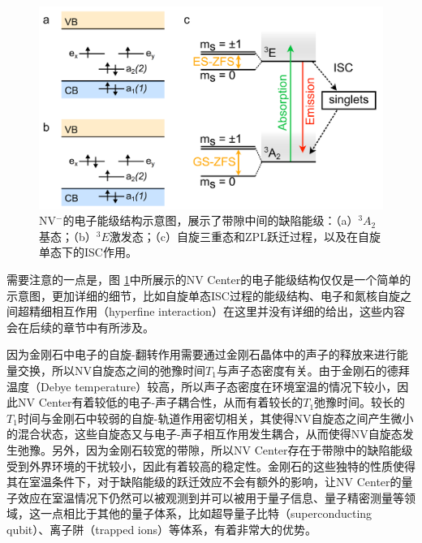 \documentclass[type = bachelor, oneside]{whu-thesis}
\begin{document}
\begin{figure}
  \centering
  \includegraphics[width=1.0\textwidth]{figures/Chapter 2/Electronic Structure.png}
  \caption[NV$^-$的电子能级结构示意图]{NV$^-$的电子能级结构示意图，展示了带隙中间的缺陷能级：（a）$^3A_2$基态；（b）$^3E$激发态；（c）自旋三重态和ZPL跃迁过程，以及在自旋单态下的ISC作用\cite{Staudacher2015}。}
  \label{fig: Electronic Structure}
\end{figure}

需要注意的一点是，图 \ref{fig: Electronic Structure}中所展示的NV Center的电子能级结构仅仅是一个简单的示意图，更加详细的细节，比如自旋单态ISC过程的能级结构、电子和氮核自旋之间超精细相互作用（hyperfine interaction）在这里并没有详细的给出，这些内容会在后续的章节中有所涉及。

因为金刚石中电子的自旋-翻转作用需要通过金刚石晶体中的声子的释放来进行能量交换，所以NV自旋态之间的弛豫时间$T_1$与声子态密度有关。由于金刚石的德拜温度（Debye temperature）较高，所以声子态密度在环境室温的情况下较小，因此NV Center有着较低的电子-声子耦合性，从而有着较长的$T_1$弛豫时间\cite{2008}。较长的$T_1$时间与金刚石中较弱的自旋-轨道作用密切相关，其使得NV自旋态之间产生微小的混合状态，这些自旋态又与电子-声子相互作用发生耦合，从而使得NV自旋态发生弛豫。另外，因为金刚石较宽的带隙，所以NV Center存在于带隙中的缺陷能级受到外界环境的干扰较小，因此有着较高的稳定性。金刚石的这些独特的性质使得其在室温条件下，对于缺陷能级的跃迁效应不会有额外的影响，让NV Center的量子效应在室温情况下仍然可以被观测到并可以被用于量子信息、量子精密测量等领域，这一点相比于其他的量子体系，比如超导量子比特（superconducting qubit）、离子阱（trapped ions）等体系，有着非常大的优势\cite{Hu2023, Acosta2013}。
\end{document}
